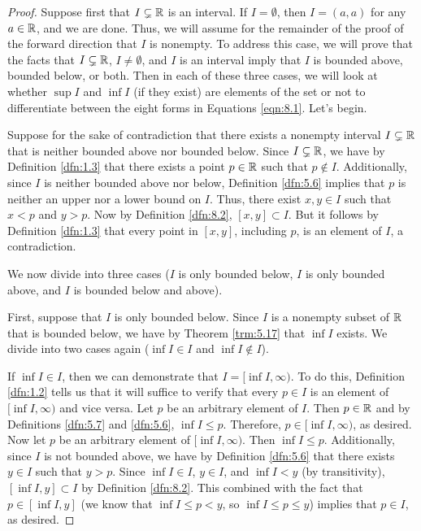 \documentclass[../main.tex]{subfiles}
\begin{document}
\begin{lemma}
\begin{proof}
        Suppose first that $I\subsetneq\mathbb{R}$ is an interval. If $I=\emptyset$, then $I=(a,a)$ for any $a\in\mathbb{R}$, and we are done. Thus, we will assume for the remainder of the proof of the forward direction that $I$ is nonempty. To address this case, we will prove that the facts that $I\subsetneq\mathbb{R}$, $I\neq\emptyset$, and $I$ is an interval imply that $I$ is bounded above, bounded below, or both. Then in each of these three cases, we will look at whether $\sup I$ and $\inf I$ (if they exist) are elements of the set or not to differentiate between the eight forms in Equations \ref{eqn:8.1}. Let's begin.\par\medskip
        Suppose for the sake of contradiction that there exists a nonempty interval $I\subsetneq\mathbb{R}$ that is neither bounded above nor bounded below. Since $I\subsetneq\mathbb{R}$, we have by Definition \ref{dfn:1.3} that there exists a point $p\in\mathbb{R}$ such that $p\notin I$. Additionally, since $I$ is neither bounded above nor below, Definition \ref{dfn:5.6} implies that $p$ is neither an upper nor a lower bound on $I$. Thus, there exist $x,y\in I$ such that $x<p$ and $y>p$. Now by Definition \ref{dfn:8.2}, $[x,y]\subset I$. But it follows by Definition \ref{dfn:1.3} that every point in $[x,y]$, including $p$, is an element of $I$, a contradiction.\par\medskip
        We now divide into three cases ($I$ is only bounded below, $I$ is only bounded above, and $I$ is bounded below and above).\par\smallskip
        First, suppose that $I$ is only bounded below. Since $I$ is a nonempty subset of $\mathbb{R}$ that is bounded below, we have by Theorem \ref{trm:5.17} that $\inf I$ exists. We divide into two cases again ($\inf I\in I$ and $\inf I\notin I$).\par
        If $\inf I\in I$, then we can demonstrate that $I=[\inf I,\infty)$. To do this, Definition \ref{dfn:1.2} tells us that it will suffice to verify that every $p\in I$ is an element of $[\inf I,\infty)$ and vice versa. Let $p$ be an arbitrary element of $I$. Then $p\in\mathbb{R}$ and by Definitions \ref{dfn:5.7} and \ref{dfn:5.6}, $\inf I\leq p$. Therefore, $p\in[\inf I,\infty)$, as desired. Now let $p$ be an arbitrary element of $[\inf I,\infty)$. Then $\inf I\leq p$. Additionally, since $I$ is not bounded above, we have by Definition \ref{dfn:5.6} that there exists $y\in I$ such that $y>p$. Since $\inf I\in I$, $y\in I$, and $\inf I<y$ (by transitivity), $[\inf I,y]\subset I$ by Definition \ref{dfn:8.2}. This combined with the fact that $p\in[\inf I,y]$ (we know that $\inf I\leq p<y$, so $\inf I\leq p\leq y$) implies that $p\in I$, as desired.\par

\end{proof}
\end{lemma}
\end{document}
